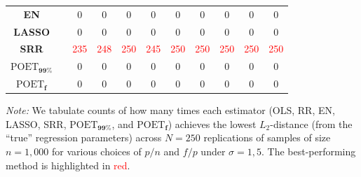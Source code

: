 \begin{table}[ht!]
{\begin{tabular*}{\textwidth}{@{\extracolsep{\fill}}ccccccccccc@{}}
\textbf{EN} &  & 0 & 0 & 0 & 0 & 0 & 0 & 0 & 0 & 0 \\
\textbf{LASSO} &  & 0 & 0 & 0 & 0 & 0 & 0 & 0 & 0 & 0 \\
\textbf{SRR} &  & \textcolor{red}{235} & \textcolor{red}{248} & \textcolor{red}{250} & \textcolor{red}{245} & \textcolor{red}{250} & \textcolor{red}{250} & \textcolor{red}{250} & \textcolor{red}{250} & \textcolor{red}{250} \\
\textbf{$\text{POET}_{\bm{99\%}}$} &  & 0 & 0 & 0 & 0 & 0 & 0 & 0 & 0 & 0 \\
\textbf{$\text{POET}_{\bm{f}}$} &  & 0 & 0 & 0 & 0 & 0 & 0 & 0 & 0 & 0 \\
\bottomrule
\end{tabular*}%
}
\begin{tablenotes}[flushleft]
\footnotesize
\item \emph{Note:} We tabulate counts of how many times each estimator (OLS, RR, EN, LASSO, SRR, $\text{POET}_{\bm{99\%}}$, and $\text{POET}_{\bm{f}}$) achieves the lowest $L_2$-distance (from the ``true'' regression parameters) across $N = 250$ replications of samples of size $n = 1,000$ for various choices of $p/n$ and $f/p$ under $\sigma=1, 5$. The best-performing method is highlighted in \textcolor{red}{red}. 
\end{tablenotes}
\end{table}

